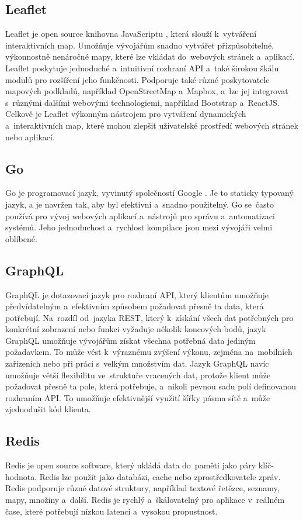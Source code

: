\subsection{Leaflet} Leaflet je open source knihovna JavaScriptu \cite{leaflet}, která slouží k~vytváření interaktivních map. Umožňuje vývojářům snadno vytvářet přizpůsobitelné, výkonnostně nenáročné mapy, které lze vkládat do~webových stránek a~aplikací. Leaflet poskytuje jednoduché a~intuitivní rozhraní API a~také širokou škálu modulů pro rozšíření jeho funkčnosti. Podporuje také různé poskytovatele mapových podkladů, například OpenStreetMap a~Mapbox, a~lze jej integrovat s~různými dalšími webovými technologiemi, například Bootstrap a~ReactJS. Celkově je Leaflet výkonným nástrojem pro vytváření dynamických a~interaktivních map, které mohou zlepšit uživatelské prostředí webových stránek nebo aplikací.
\subsection{Go} Go je programovací jazyk, vyvinutý společností Google \cite{go}. Je to staticky typovaný jazyk, a je navržen tak, aby byl efektivní a~snadno použitelný. Go se~často používá pro vývoj webových aplikací a~nástrojů pro správu a~automatizaci systémů. Jeho jednoduchost a~rychlost kompilace jsou mezi vývojáři velmi oblíbené.
\newpage
\subsection{GraphQL}\label{graphql} GraphQL \cite{graphql} je dotazovací jazyk pro rozhraní API, který klientům umožňuje předvídatelným a~efektivním způsobem požadovat přesně ta data, která potřebují. Na~rozdíl od~jazyka REST, který k~získání všech dat potřebných pro konkrétní zobrazení nebo funkci vyžaduje několik koncových bodů, jazyk GraphQL umožňuje vývojářům získat všechna potřebná data jediným požadavkem. To může vést k~výraznému zvýšení výkonu, zejména na~mobilních zařízeních nebo při práci s~velkým množstvím dat. Jazyk GraphQL navíc umožňuje větší flexibilitu ve~struktuře vracených dat, protože klient může požadovat přesně ta pole, která potřebuje, a~nikoli pevnou sadu polí definovanou rozhraním API. To umožňuje efektivnější využití šířky pásma sítě a~může zjednodušit kód klienta.
\subsection{Redis}\label{redis} Redis je open source software, který ukládá data do~paměti jako páry klíč-hodnota. Redis lze použít jako databázi, cache nebo zprostředkovatele zpráv. Redis podporuje různé datové struktury, například textové řetězce, seznamy, mapy, množiny a~další. Redis je rychlý a~škálovatelný pro aplikace v~reálném čase, které potřebují nízkou latenci a~vysokou propustnost. \cite{redis}

